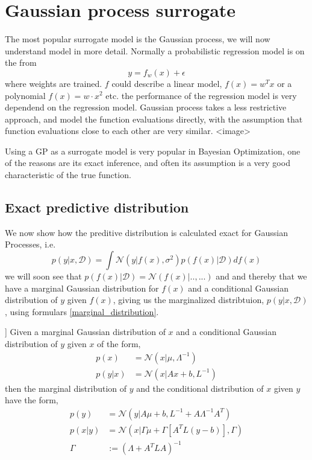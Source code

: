 \section{Gaussian process surrogate}

The most popular surrogate model is the Gaussian process, we will now understand model
in more detail. Normally a probabilistic regression model is on the from 
$$y = f_w(x) + \epsilon$$
where weights are trained. $f$ could describe a linear model, $f(x) = w^Tx$ or a polynomial
$f(x) = w\cdot x^2$ etc. the performance of the regression model is very dependend on the 
regression model. Gaussian process takes a less restrictive approach, and model the function
evaluations directly, with the assumption that function evaluations close to each other are 
very similar. 
<image>

Using a GP as a surrogate model is very popular in Bayesian Optimization, one of the reasons
are its exact inference, and often its assumption is a very good characteristic of the true
function. 

\subsection{Exact predictive distribution}
We now show how the preditive distribution is calculated exact for
Gaussian Processes, i.e. 
\begin{equation}\label{GP_predictive}
    p(y|x,\mathcal{D}) = \int \mathcal{N}(y|f(x), \sigma^2) p(f(x)|\mathcal{D})df(x)
\end{equation}
we will soon see that $p(f(x)|\mathcal{D}) = \mathcal{N}(f(x)| .., ...)$ and
and thereby that we have a marginal Gaussian distribution for $f(x)$ and a 
conditional Gaussian distribution of $y$ given $f(x)$, giving us the marginalized
distribtuion, $p(y|x,\mathcal{D})$, using formulars \eqref{marginal_distribution}. 

\begin{testexample2}[Trick with normal distributions [from Bishops book?]]
    Given a marginal Gaussian distribution of $x$ and a conditional Gaussian distribution
    of $y$ given $x$ of the form, 
    \begin{align*}
        p(x) &= \mathcal{N}(x|\mu, \Lambda^{-1})\\
        p(y|x) &= \mathcal{N}(x|Ax+b, L^{-1})
    \end{align*}
    then the marginal distribution of $y$ and the conditional distribution of $x$ given $y$
    have the form, 
    \begin{align}
        p(y) &= \mathcal{N}(y|A\mu+b,L^{-1}+A \Lambda^{-1}A^T) \label{marginal_distribution}\\
        p(x|y) &= \mathcal{N}(x|\Gamma \mu+\Gamma [A^TL(y-b)],\Gamma )\\
        \Gamma &:= (\Lambda +A^TLA)^{-1}
    \end{align}
\end{testexample2}

